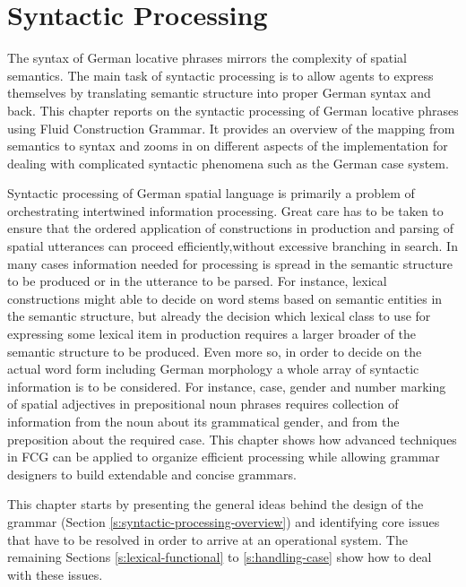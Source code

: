 %

\chapter{Syntactic Processing}
\label{s:german-locative-phrases-syntax}
The syntax of German locative phrases mirrors the complexity of 
spatial semantics. The main task of syntactic processing is to 
allow agents to express themselves by translating semantic structure into 
proper German syntax and back. This chapter reports on the syntactic 
processing of German locative phrases using Fluid Construction Grammar. 
It provides an overview of the mapping from semantics to syntax and 
zooms in on different aspects of the implementation for dealing with complicated
syntactic phenomena such as the German case system.

Syntactic processing of German spatial language is primarily a problem
of orchestrating intertwined information processing. Great care
has to be taken to ensure that the ordered application of constructions 
in production and parsing of spatial utterances can proceed efficiently,without 
excessive branching in search. In many cases information
needed for processing is spread in the semantic structure to 
be produced or in the utterance to be parsed. For instance, 
lexical constructions might able to decide on word stems based
on semantic entities in the semantic structure, but already 
the decision which lexical class to use for expressing some lexical item 
in production requires a larger broader of the semantic
structure to be produced. Even more so, in order to decide on the actual
word form including German morphology a whole array of syntactic information 
is to be considered. For instance, case, gender and number marking 
of spatial adjectives in prepositional noun phrases requires collection of  
information from the noun about its grammatical gender, and from 
the preposition about the required 
case. This chapter shows how advanced techniques
in FCG can be applied to organize efficient processing while 
allowing grammar designers to build extendable and concise grammars.

This chapter starts by presenting the general ideas behind the design of 
the grammar (Section \ref{s:syntactic-processing-overview}) and
identifying core issues that have to be resolved in order to arrive at an
operational system. The remaining Sections \ref{s:lexical-functional}
to \ref{s:handling-case} show how to deal with these issues.

